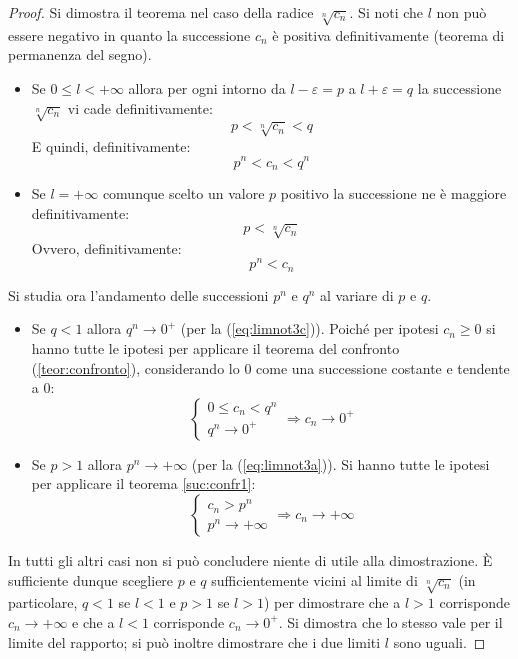 \begin{proof}
	Si dimostra il teorema nel caso della radice $\sqrt[n]{c_n}$. Si noti che $l$ non può essere negativo in quanto la successione $c_n$ è positiva definitivamente (teorema di permanenza del segno).
	\begin{itemize}
		\item Se $0\leq l<+\infty$ allora per ogni intorno da $l-\varepsilon=p$ a $l+\varepsilon=q$ la successione $\sqrt[n]{c_n}$ vi cade definitivamente:
		      \[
			      p<\sqrt[n]{c_n}<q
		      \]
		      E quindi, definitivamente:
		      \[
			      p^n<c_n<q^n
		      \]
		\item Se $l=+\infty$ comunque scelto un valore $p$ positivo la successione ne è maggiore definitivamente:
		      \[
			      p<\sqrt[n]{c_n}
		      \]
		      Ovvero, definitivamente:
		      \[
			      p^n<c_n
		      \]
	\end{itemize}
	Si studia ora l'andamento delle successioni $p^n$ e $q^n$ al variare di $p$ e $q$.
	\begin{itemize}
		\item Se $q<1$ allora $q^n\to0^+$ (per la (\ref{eq:limnot3c})). Poiché per ipotesi $c_n\geq0$ si hanno tutte le ipotesi per applicare il teorema del confronto (\vref{teor:confronto}), considerando lo $0$ come una successione costante e tendente a $0$:
		      \[
			      \begin{cases}
				      0\leq c_n<q^n \\
				      q^n\to0^+
			      \end{cases}\Rightarrow c_n\to0^+
		      \]
		\item Se $p>1$ allora $p^n\to+\infty$ (per la (\ref{eq:limnot3a})). Si hanno tutte le ipotesi per applicare il teorema \vref{suc:confr1}:
		      \[
			      \begin{cases}
				      c_n>p^n \\
				      p^n\to+\infty
			      \end{cases}\Rightarrow c_n\to+\infty
		      \]
	\end{itemize}
	In tutti gli altri casi non si può concludere niente di utile alla dimostrazione. È sufficiente dunque scegliere $p$ e $q$ sufficientemente vicini al limite di $\sqrt[n]{c_n}$ (in particolare, $q<1$ se $l<1$ e $p>1$ se $l>1$) per dimostrare che a $l>1$ corrisponde $c_n\to+\infty$ e che a $l<1$ corrisponde $c_n\to0^+$. Si dimostra che lo stesso vale per il limite del rapporto; si può inoltre dimostrare che i due limiti $l$ sono uguali.
\end{proof}


